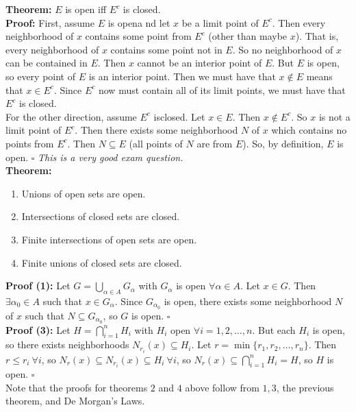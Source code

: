 \documentclass{article}
\begin{document}
\textbf{Theorem:} $E$ is open iff $E^c$ is closed. \\
\textbf{Proof:} First, assume $E$ is opena nd let $x$ be a limit point of $E^c$. Then every neighborhood of $x$ contains some point from $E^c$ (other than maybe $x$). That is, every neighborhood of $x$ contains some point not in $E$. So no neighborhood of $x$ can be contained in $E$. Then $x$ cannot be an interior point of $E$. But $E$ is open, so every point of $E$ is an interior point. Then we must have that $x \notin E$ means that $x \in E^c$. Since $E^c$ now must contain all of its limit points, we must have that $E^c$ is closed.\\
\newline
For the other direction, assume $E^c$ isclosed. Let $x \in E$. Then $x \notin E^c$. So $x$ is not a limit point of $E^c$. Then there exists some neighborhood $N$ of $x$ which contains no points from $E^c$. Then $N \subseteq E$ (all points of $N$ are from $E$). So, by definition, $E$ is open. $\square $ \textit{This is a very good exam question.}\\

\textbf{Theorem:} \begin{enumerate}
    \item Unions of open sets are open.
    \item Intersections of closed sets are closed.
    \item Finite intersections of open sets are open.
    \item Finite unions of closed sets are closed. 
\end{enumerate}

\textbf{Proof (1):} Let $G = \bigcup_{\alpha \in A} G_{\alpha}$ with $G_{\alpha}$ is open $\forall \alpha \in A$. Let $x \in G$. Then $\exists \alpha_0 \in A$ such that $x \in G_{\alpha}$. Since $G_{\alpha_0}$ is open, there exists some neighborhood $N$ of $x$ such that $N \subseteq G_{\alpha_0}$, so $G$ is open. $\square$\\

\textbf{Proof (3):} Let $H = \bigcap_{i = 1}^n H_i$ with $H_i$ open $\forall i = 1,2,\dots,n$. But each $H_i$ is open, so there exists neighborhoods $N_{r_i}(x) \subseteq H_i$. Let $r = \min{\{r_1, r_2, \dots, r_n\}}$. Then $r \leq r_i \ \forall i$, so $N_r(x) \subseteq N_{r_i}(x) \subseteq H_i \ \forall i$, so $N_r(x) \subseteq \bigcap_{i = 1}^n H_i = H$, so $H$ is open. $\square$\\

Note that the proofs for theorems $2$ and $4$ above follow from $1, 3$, the previous theorem, and De Morgan's Laws.\\
\end{document}
